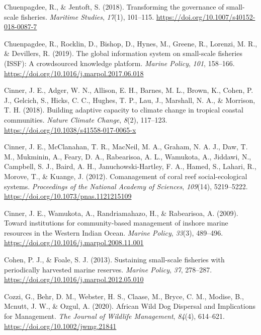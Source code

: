 \documentclass[
]{article}
\newlength{\cslhangindent}
\newlength{\cslentryspacingunit} %
\newenvironment{CSLReferences}[2] %
 {%
  \setlength{\parindent}{0pt}
  \ifodd #1
  \let\oldpar\par
  \def\par{\hangindent=\cslhangindent\oldpar}
  \fi
  \setlength{\parskip}{#2\cslentryspacingunit}
 }%
 {}
\begin{document}
\begin{CSLReferences}{1}{2}
\leavevmode{}%
Chuenpagdee, R., \& Jentoft, S. (2018). Transforming the governance of small-scale fisheries. \emph{Maritime Studies}, \emph{17}(1), 101--115. \url{https://doi.org/10.1007/s40152-018-0087-7}

\leavevmode{}%
Chuenpagdee, R., Rocklin, D., Bishop, D., Hynes, M., Greene, R., Lorenzi, M. R., \& Devillers, R. (2019). The global information system on small-scale fisheries ({ISSF}): {A} crowdsourced knowledge platform. \emph{Marine Policy}, \emph{101}, 158--166. \url{https://doi.org/10.1016/j.marpol.2017.06.018}

\leavevmode{}%
Cinner, J. E., Adger, W. N., Allison, E. H., Barnes, M. L., Brown, K., Cohen, P. J., Gelcich, S., Hicks, C. C., Hughes, T. P., Lau, J., Marshall, N. A., \& Morrison, T. H. (2018). Building adaptive capacity to climate change in tropical coastal communities. \emph{Nature Climate Change}, \emph{8}(2), 117--123. \url{https://doi.org/10.1038/s41558-017-0065-x}

\leavevmode{}%
Cinner, J. E., McClanahan, T. R., MacNeil, M. A., Graham, N. A. J., Daw, T. M., Mukminin, A., Feary, D. A., Rabearisoa, A. L., Wamukota, A., Jiddawi, N., Campbell, S. J., Baird, A. H., Januchowski-Hartley, F. A., Hamed, S., Lahari, R., Morove, T., \& Kuange, J. (2012). Comanagement of coral reef social-ecological systems. \emph{Proceedings of the National Academy of Sciences}, \emph{109}(14), 5219--5222. \url{https://doi.org/10.1073/pnas.1121215109}

\leavevmode{}%
Cinner, J. E., Wamukota, A., Randriamahazo, H., \& Rabearisoa, A. (2009). Toward institutions for community-based management of inshore marine resources in the {Western} {Indian} {Ocean}. \emph{Marine Policy}, \emph{33}(3), 489--496. \url{https://doi.org/10.1016/j.marpol.2008.11.001}

\leavevmode{}%
Cohen, P. J., \& Foale, S. J. (2013). Sustaining small-scale fisheries with periodically harvested marine reserves. \emph{Marine Policy}, \emph{37}, 278--287. \url{https://doi.org/10.1016/j.marpol.2012.05.010}

\leavevmode{}%
Cozzi, G., Behr, D. M., Webster, H. S., Claase, M., Bryce, C. M., Modise, B., Mcnutt, J. W., \& Ozgul, A. (2020). African {Wild} {Dog} {Dispersal} and {Implications} for {Management}. \emph{The Journal of Wildlife Management}, \emph{84}(4), 614--621. \url{https://doi.org/10.1002/jwmg.21841}


\end{CSLReferences}
\end{document}
